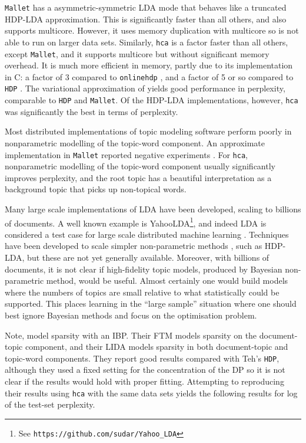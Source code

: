 \documentclass[twoside,11pt]{article}
\begin{document}
{\tt Mallet} \cite{McCallumMALLET} has a asymmetric-symmetric
LDA mode that behaves like a truncated HDP-LDA approximation.
This is significantly faster than all others, and also supports
multicore.  
However, it uses memory duplication with multicore so is not
able to run on larger data sets. 
Similarly, {\tt hca} is a factor faster than all others,
except {\tt Mallet}, and it supports multicore but without
significant memory overhead.
It is much more efficient in memory, partly due
to its implementation in C:  a factor of 3 compared to
{\tt onlinehdp} \cite{WangPB:AISTATS11}, and a factor of 5 or so compared to
{\tt HDP} \cite{TehNBMM21}.
The variational approximation of \cite{Sato:2010} yields
good performance in perplexity, comparable to {\tt HDP} and {\tt Mallet}.
Of the HDP-LDA implementations, however, {\tt hca} was
significantly the best in terms of perplexity.

Most distributed implementations of topic modeling software
perform poorly in nonparametric modelling of
the topic-word component.
An approximate implementation in {\tt Mallet} reported negative
experiments \cite{wallach2009rethinking}.
For {\tt hca}, nonparametric modelling of
the topic-word component usually significantly improves
perplexity, and the root topic has a beautiful interpretation
as a background topic that picks up non-topical words.

Many large scale implementations of LDA have been developed,
scaling to billions of documents.
A well known example is YahooLDA\footnote{See \tt https://github.com/sudar/Yahoo\_LDA}, and indeed LDA is considered a test case for large scale distributed machine
learning \cite{LiAnd14}.  Techniques have been developed
to scale simpler non-parametric methods \cite{LiAhmed14},
such as HDP-LDA, but these are not yet generally available.
Moreover, with billions of documents, it is not clear if high-fidelity
topic models, produced by Bayesian non-parametric method, would be useful.
Almost certainly one would build models where the numbers of topics
are small relative to what statistically could be supported.
This places learning in the ``large sample'' situation where one should
best ignore Bayesian methods and focus on the optimisation problem.

Note, \cite{archambeau2015latent} model sparsity with an
IBP.  Their FTM models sparsity on the
document-topic component,
and their LIDA models sparsity in both document-topic and
topic-word components.
They report good results
compared with Teh's {\tt HDP}, although they used a fixed
setting for the concentration of the DP so it is
not clear if the results would hold with proper fitting.
Attempting to reproducing their results using
{\tt hca} with the same data sets yields
the following results for log of the test-set perplexity.
\end{document}
